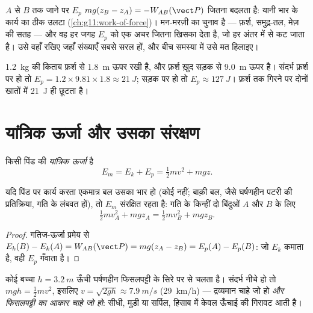 \begin{remark}[मायने केवल अंतर रखते हैं]\label{rem:g11:mechanical-energy:reference}
$A$ से $B$ तक जाने पर $E_p$ $mg(z_B - z_A) =
-W_{AB}(\vect P)$ जितना बदलता है: यानी भार
के कार्य का ठीक उलटा (\cref{ch:g11:work-of-force})।  मन-मरज़ी का
चुनाव है --- फ़र्श, समुद्र-तल, मेज़ की सतह --- और वह हर जगह $E_p$ को एक अचर
जितना खिसका देता है, जो हर अंतर में से कट जाता है। उसे वहाँ रखिए जहाँ
संख्याएँ सबसे सरल हों, और बीच समस्या में उसे मत हिलाइए।
\end{remark}

\begin{example}[ताक़ पर रखी किताब]\label{ex:g11:mechanical-energy:shelf}
\qty{1.2}{kg} की किताब फ़र्श से \qty{1.8}{m} ऊपर रखी है, और फ़र्श ख़ुद सड़क से \qty{9.0}{m}
ऊपर है। संदर्भ फ़र्श पर हो तो $E_p = 1.2 \times 9.81 \times 1.8 \approx \qty{21}{J}$; सड़क पर हो तो $E_p \approx \qty{127}{J}$। फ़र्श तक गिरने पर
दोनों खातों में \qty{21}{J} ही छूटता है।
\end{example}

\section{यांत्रिक ऊर्जा और उसका संरक्षण}

\begin{definition}[यांत्रिक ऊर्जा]\label{def:g11:mechanical-energy:em}
किसी पिंड की \emph{यांत्रिक ऊर्जा} है
\[
E_m = E_k + E_p = \tfrac12 m v^2 + m g z .
\]
\end{definition}

\begin{theorem}[यांत्रिक ऊर्जा का संरक्षण]\label{thm:g11:mechanical-energy:conservation}
यदि पिंड पर कार्य करता एकमात्र बल उसका भार हो (कोई
 नहीं; बाक़ी बल, जैसे घर्षणहीन पटरी की प्रतिक्रिया, गति
के लंबवत हों), तो $E_m$ संरक्षित रहता है: गति के किन्हीं दो बिंदुओं $A$
और $B$ के लिए
\[
\tfrac12 m v_A^2 + m g z_A = \tfrac12 m v_B^2 + m g z_B .
\]
\end{theorem}

\begin{proof}
गतिज-ऊर्जा प्रमेय से $E_k(B) - E_k(A) = W_{AB}(\vect P) =
mg(z_A - z_B) = E_p(A) - E_p(B)$: जो $E_k$ कमाता है, वही $E_p$
गँवाता है।
\end{proof}

\begin{example}[पानी की फिसलपट्टी]\label{ex:g11:mechanical-energy:slide}
कोई बच्चा $h = \qty{3.2}{m}$ ऊँची घर्षणहीन फिसलपट्टी के सिरे पर  से चलता है। संदर्भ
नीचे हो तो $mgh = \tfrac12 mv^2$, इसलिए $v = \sqrt{2gh} \approx \qty{7.9}{m/s}$ (\qty{29}{km/h}) --- द्रव्यमान चाहे जो हो
\emph{और फिसलपट्टी का आकार चाहे जो हो}: सीधी, मुड़ी या सर्पिल, हिसाब में
केवल ऊँचाई की गिरावट आती है।
\end{example}

